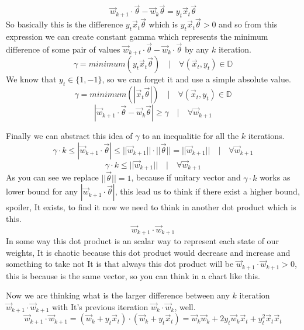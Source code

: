 \documentclass[12pt]{article}
\begin{document}
\[
  \vec{w}_{k + 1} \cdot \vec{\theta} -  \vec{w}_{k}\vec{\theta}
  =  y_t\vec{x}_t\vec{\theta}
\]
So basically this is
the difference $y_t\vec{x}_t\vec{\theta}$ which is $y_t\vec{x}_t\vec{\theta} > 0$ and so
from this expression we can create constant gamma which represents the minimum
difference of some pair of values $\vec{w}_{k+t} \cdot \vec{\theta} - \vec{w}_{k} \cdot \vec{\theta}$
by any $k$ iteration.
\[
  \gamma = minimum(y_t \vec{x}_t\vec{\theta}) \quad|\quad \forall (\vec{x}_t, y_t) \in \mathbb{D}
\]
We know that $y_t \in \{1, -1\}$, so we can forget it and use a simple absolute value.
\[
  \gamma = minimum(|\vec{x}_t\vec{\theta}|) \quad|\quad \forall (\vec{x}_t, y_t) \in \mathbb{D}
\]
\[
  |\vec{w}_{k + 1} \cdot \vec{\theta} -  \vec{w}_{k}\vec{\theta}|
  \ge \gamma\quad | \quad \forall \vec{w}_{k+1}
\]

Finally we can abstract this idea of $\gamma$ to an inequalitie for all the $k$ iterations.
\[
  \gamma \cdot k \le |\vec{w}_{k+1} \cdot \vec{\theta}| \le ||\vec{w}_{k+1}||\cdot ||\vec{\theta}||
  = ||\vec{w}_{k+1}||\quad|\quad \forall \vec{w}_{k + 1}
\]
\[
  \gamma \cdot k \le ||\vec{w}_{k+1}||\quad|\quad \forall \vec{w}_{k + 1}
\]
As you can see we replace $||\vec{\theta}|| = 1$, because if unitary vector and
$\gamma \cdot k$ works as lower bound for any $|\vec{w}_{k + 1}\cdot \vec{\theta} |$, this lead us
to think if there exist a higher bound, spoiler, It exists, to find it now we need to think in another
dot product which is this.
\[
  \vec{w}_{k + 1} \cdot \vec{w}_{k+1}
\]
In some way this dot product is an scalar way to represent each state of our weights, It is chaotic
because this dot product would decrease and increase and something to take not It is that
always this dot product will be
$\vec{w}_{k + 1} \cdot \vec{w}_{k+1} > 0$, this is because is the same vector,
so you can think in a chart like this.
\begin{center}
\end{center}
Now we are thinking
what is the larger difference between
any $k$ iteration $\vec{w}_{k+1} \cdot \vec{w}_{k+1}$ with It's
previous iteration $\vec{w}_{k} \cdot \vec{w}_{k}$, well.
\[
  \vec{w}_{k + 1} \cdot \vec{w}_{k + 1} = (\vec{w}_{k} + y_t\vec{x}_t) \cdot (\vec{w}_{k} + y_t\vec{x}_t)
  = \vec{w}_k\vec{w}_k + 2y_t\vec{w}_k\vec{x}_t + y_t^2\vec{x}_t\vec{x}_t
\]
\end{document}
